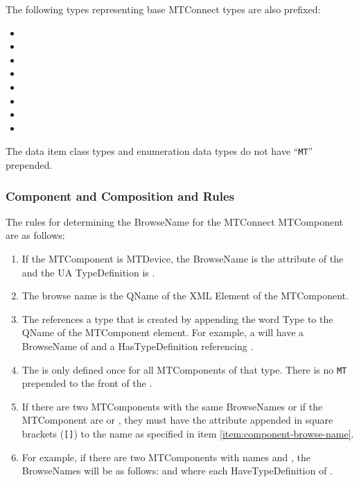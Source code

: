 The following types representing base MTConnect types are also prefixed:

\begin{itemize}
  \setlength\itemsep{0em}
  \item {}
  \item {}
  \item {}
  \item {}
  \item {}
  \item {}
  \item {}
  \item {}
\end{itemize}

The data item class types and enumeration data types do not have ``\texttt{MT}'' prepended.

\subsubsection{Component and Composition  and  Rules}

The rules for determining the \gls{BrowseName} for the MTConnect \gls{MTComponent} are as follows:

\begin{enumerate}
  \item If the \gls{MTComponent} is \gls{MTDevice}, the \gls{BrowseName} is the  attribute of the  and the UA \gls{TypeDefinition} is .
  \item The browse name is the \gls{QName} of the XML Element of the \gls{MTComponent}. \label{item:component-browse-name}
  \item The  references a type that is created by appending the word \gls{Type} to the \gls{QName} of the \gls{MTComponent} element. For example, a  will have a \gls{BrowseName} of  and a \gls{HasTypeDefinition} referencing .
  \item The  is only defined once for all \glspl{MTComponent} of that type. There is no \texttt{MT} prepended to the front of the  .
  \item If there are two \glspl{MTComponent} with the same \glspl{BrowseName} or if the \gls{MTComponent} are  or , they must have the  attribute appended in square brackets (\texttt{[]}) to the name as specified in item \ref{item:component-browse-name}. 
  \item For example, if there are two  \glspl{MTComponent} with names  and , the \glspl{BrowseName} will be as follows:  and  where each \gls{HaveTypeDefinition} of .
\end{enumerate}

